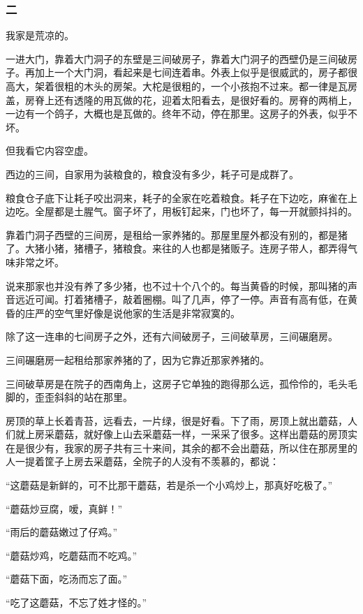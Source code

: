 \subsubsection*{二}
\par 我家是荒凉的。
\par 一进大门，靠着大门洞子的东壁是三间破房子，靠着大门洞子的西壁仍是三间破房子。再加上一个大门洞，看起来是七间连着串。外表上似乎是很威武的，房子都很高大，架着很粗的木头的房架。大柁是很粗的，一个小孩抱不过来。都一律是瓦房盖，房脊上还有透隆的用瓦做的花，迎着太阳看去，是很好看的。房脊的两梢上，一边有一个鸽子，大概也是瓦做的。终年不动，停在那里。这房子的外表，似乎不坏。
\par 但我看它内容空虚。
\par 西边的三间，自家用为装粮食的，粮食没有多少，耗子可是成群了。
\par 粮食仓子底下让耗子咬出洞来，耗子的全家在吃着粮食。耗子在下边吃，麻雀在上边吃。全屋都是土腥气。窗子坏了，用板钉起来，门也坏了，每一开就颤抖抖的。
\par 靠着门洞子西壁的三间房，是租给一家养猪的。那屋里屋外都没有别的，都是猪了。大猪小猪，猪槽子，猪粮食。来往的人也都是猪贩子。连房子带人，都弄得气味非常之坏。
\par 说来那家也并没有养了多少猪，也不过十个八个的。每当黄昏的时候，那叫猪的声音远近可闻。打着猪槽子，敲着圈棚。叫了几声，停了一停。声音有高有低，在黄昏的庄严的空气里好像是说他家的生活是非常寂寞的。
\par 除了这一连串的七间房子之外，还有六间破房子，三间破草房，三间碾磨房。
\par 三间碾磨房一起租给那家养猪的了，因为它靠近那家养猪的。
\par 三间破草房是在院子的西南角上，这房子它单独的跑得那么远，孤伶伶的，毛头毛脚的，歪歪斜斜的站在那里。
\par 房顶的草上长着青苔，远看去，一片绿，很是好看。下了雨，房顶上就出蘑菇，人们就上房采蘑菇，就好像上山去采蘑菇一样，一采采了很多。这样出蘑菇的房顶实在是很少有，我家的房子共有三十来间，其余的都不会出蘑菇，所以住在那房里的人一提着筐子上房去采蘑菇，全院子的人没有不羡慕的，都说：
\par “这蘑菇是新鲜的，可不比那干蘑菇，若是杀一个小鸡炒上，那真好吃极了。”
\par “蘑菇炒豆腐，嗳，真鲜！”
\par “雨后的蘑菇嫩过了仔鸡。”
\par “蘑菇炒鸡，吃蘑菇而不吃鸡。”
\par “蘑菇下面，吃汤而忘了面。”
\par “吃了这蘑菇，不忘了姓才怪的。”
